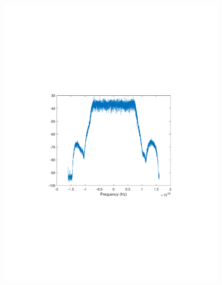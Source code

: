 \begin{refsection}
\begin{figure}[H]
	\centering
	\begin{minipage}{0.30\textwidth}
		\centering
		\includegraphics[clip, trim=4cm 8cm 4cm 8cm, width=1\textwidth]{./sdf/m_qam_system/figures/expResults/intradyne/5_16GBdInSig13dB_AfPE1.pdf}
		\label{fig:16GBdEyePE1}
	\end{minipage}
	\begin{minipage}{0.30\textwidth}
		\centering

\end{minipage}
\end{figure}
\end{refsection}
